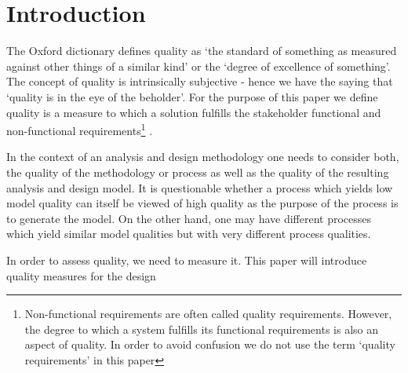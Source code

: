 \section{Introduction}\label{sec:Introduction}

The Oxford dictionary defines quality as `the standard of something as measured against other things of a similar kind' or the `degree of excellence of something'. The concept of quality is intrinsically subjective - hence we have the saying that `quality is in the eye of the beholder'. For the purpose of this paper we define quality is a measure to which a solution fulfills the stakeholder functional and non-functional requirements\footnote{Non-functional requirements are often called quality requirements\cite{}. However, the degree to which a system fulfills its functional requirements is also an aspect of quality. In order to avoid confusion we do not use the term `quality requirements' in this paper} \cite{lange_managing_2005,lange_improving_2006}.


In the context of an analysis and design methodology one needs to consider both, the quality of the methodology or process as well as the quality of the resulting analysis and design model. It is questionable whether a process which yields low model quality can itself be viewed of high quality as the purpose of the process is to generate the model. On the other hand, one may have different processes which yield similar model qualities but with very different process qualities. 

In order to assess quality, we need to measure it. This paper will introduce quality measures for the design